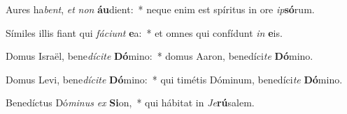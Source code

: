 \item Aures ha\textit{bent}, \textit{et} \textit{non} \textbf{áu}dient:~* neque enim est spíritus in ore \textit{ip}\textbf{só}rum.
\item Símiles illis fiant qui \textit{fá}\textit{ci}\textit{unt} \textbf{e}a:~* et omnes qui confídunt \textit{in} \textbf{e}is.
\item Domus Israël, bene\textit{dí}\textit{ci}\textit{te} \textbf{Dó}mino:~* domus Aaron, benedíci\textit{te} \textbf{Dó}mino.
\item Domus Levi, bene\textit{dí}\textit{ci}\textit{te} \textbf{Dó}mino:~* qui timétis Dóminum, benedíci\textit{te} \textbf{Dó}mino.
\item Benedíctus Dó\textit{mi}\textit{nus} \textit{ex} \textbf{Si}on,~* qui hábitat in \textit{Je}\textbf{rú}salem.
